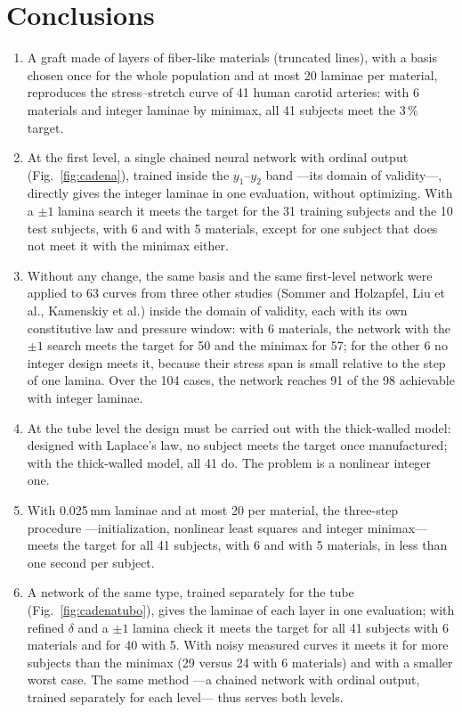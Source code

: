 \section{Conclusions}
\begin{enumerate}
\item A graft made of layers of fiber-like materials (truncated lines), with a basis chosen once for the whole population and at most 20 laminae per material, reproduces the stress--stretch curve of 41 human carotid arteries: with 6 materials and integer laminae by minimax, all 41 subjects meet the 3\,\% target.
\item At the first level, a single chained neural network with ordinal output (Fig.~\ref{fig:cadena}), trained inside the $y_1$--$y_2$ band ---its domain of validity---, directly gives the integer laminae in one evaluation, without optimizing. With a $\pm1$ lamina search it meets the target for the 31 training subjects and the 10 test subjects, with 6 and with 5 materials, except for one subject that does not meet it with the minimax either.
\item Without any change, the same basis and the same first-level network were applied to 63 curves from three other studies (Sommer and Holzapfel, Liu et al., Kamenskiy et al.) inside the domain of validity, each with its own constitutive law and pressure window: with 6 materials, the network with the $\pm1$ search meets the target for 50 and the minimax for 57; for the other 6 no integer design meets it, because their stress span is small relative to the step of one lamina. Over the 104 cases, the network reaches 91 of the 98 achievable with integer laminae.
\item At the tube level the design must be carried out with the thick-walled model: designed with Laplace's law, no subject meets the target once manufactured; with the thick-walled model, all 41 do. The problem is a nonlinear integer one.
\item With 0.025\,mm laminae and at most 20 per material, the three-step procedure ---initialization, nonlinear least squares and integer minimax--- meets the target for all 41 subjects, with 6 and with 5 materials, in less than one second per subject.
\item A network of the same type, trained separately for the tube (Fig.~\ref{fig:cadenatubo}), gives the laminae of each layer in one evaluation; with refined $\delta$ and a $\pm1$ lamina check it meets the target for all 41 subjects with 6 materials and for 40 with 5. With noisy measured curves it meets it for more subjects than the minimax (29 versus 24 with 6 materials) and with a smaller worst case. The same method ---a chained network with ordinal output, trained separately for each level--- thus serves both levels.
\end{enumerate}
